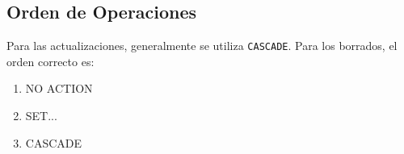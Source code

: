 \documentclass{article}
\begin{document}
\subsection{Orden de Operaciones}

Para las actualizaciones, generalmente se utiliza \texttt{CASCADE}. Para los borrados, el orden correcto es:

\begin{enumerate}
    \item NO ACTION
    \item SET...
    \item CASCADE
\end{enumerate}






\begin{comment}
\begin{figure}[h]
    \centering
    \texttt{[image: 1.png]}
    \caption{}
\end{figure}
\end{comment}

\begin{comment}
\begin{wrapfigure}[]{r}{0.5\linewidth}
    \centering
    \texttt{[image: 8.png]}
    \caption{}
\end{wrapfigure}
\end{comment}
\end{document}
